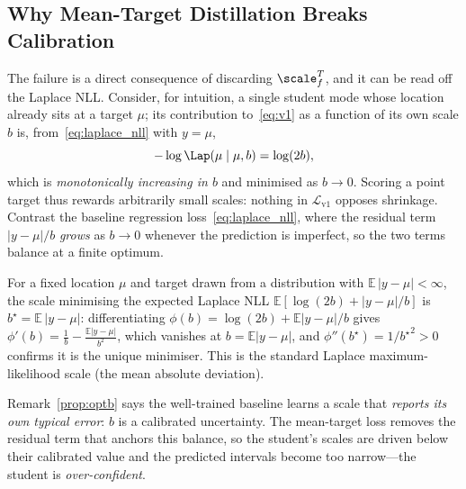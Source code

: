 \subsection{Why Mean-Target Distillation Breaks Calibration}
\label{ssec:method_calib}
The failure is a direct consequence of discarding $\scale^T_f$, and it can be read
off the Laplace NLL. Consider, for intuition, a single student mode whose location
already sits at a target $\mu$; its contribution to~\eqref{eq:v1} as a function of
its own scale $b$ is, from~\eqref{eq:laplace_nll} with $y=\mu$,
\begin{equation}
  \label{eq:shrink}
  -\log\Lap(\mu\mid\mu,b) = \log(2b),
\end{equation}
which is \emph{monotonically increasing in $b$} and minimised as $b\to 0$. Scoring a
point target thus rewards arbitrarily small scales: nothing in $\mathcal{L}_{\mathrm{v1}}$
opposes shrinkage. Contrast the baseline regression loss~\eqref{eq:laplace_nll},
where the residual term $|y-\mu|/b$ \emph{grows} as $b\to0$ whenever the prediction
is imperfect, so the two terms balance at a finite optimum.

\begin{remark}
\label{prop:optb}
For a fixed location $\mu$ and target drawn from a distribution with
$\mathbb{E}\,|y-\mu| < \infty$, the scale minimising the expected Laplace NLL
$\mathbb{E}\!\left[\log(2b) + |y-\mu|/b\right]$ is $b^\star = \mathbb{E}\,|y-\mu|$:
differentiating $\phi(b)=\log(2b) + \mathbb{E}|y-\mu|/b$ gives
$\phi'(b)=\tfrac{1}{b}-\tfrac{\mathbb{E}|y-\mu|}{b^2}$, which vanishes at
$b=\mathbb{E}|y-\mu|$, and $\phi''(b^\star)=1/{b^\star}^2>0$ confirms it is the
unique minimiser. This is the standard Laplace maximum-likelihood scale (the mean
absolute deviation).
\end{remark}

Remark~\ref{prop:optb} says the well-trained baseline learns a scale that
\emph{reports its own typical error}: $b$ is a calibrated uncertainty. The
mean-target loss removes the residual term that anchors this balance, so the
student's scales are driven below their calibrated value and the predicted
intervals become too narrow---the student is \emph{over-confident}.

